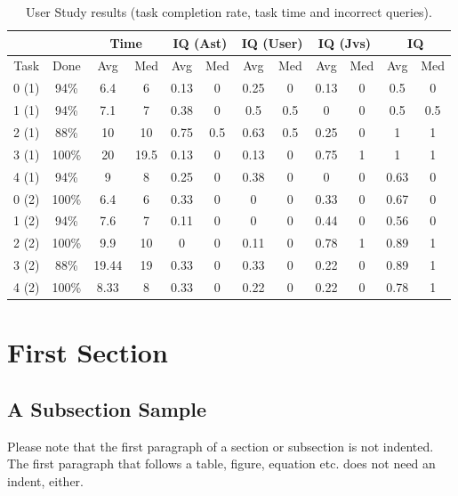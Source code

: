 \documentclass[runningheads]{llncs}
\begin{document}
\begin{table}
    \caption{User Study results (task completion rate, task time and incorrect queries).}
    \centering
    \begin{tabular}{ | c | c | c | c | c | c | c | c | c | c | c | c |}
    \hline
    \multicolumn{2}{|c|}{} & \multicolumn{2}{|c|}{Time} & \multicolumn{2}{|c|}{IQ (Ast)} & \multicolumn{2}{|c|}{IQ (User)} & \multicolumn{2}{|c|}{IQ (Jvs)} & \multicolumn{2}{|c|}{IQ} \\ \hline
    Task & Done & Avg & Med & Avg & Med & Avg & Med & Avg & Med & Avg & Med \\ \hline
    
    0 (1) & 94\% & 6.4 & 6 & 0.13 & 0 & 0.25 & 0 & 0.13 & 0 & 0.5 & 0 \\ \hline
    1 (1) & 94\% & 7.1 & 7 & 0.38 & 0 & 0.5 & 0.5 & 0 & 0 & 0.5 & 0.5 \\ \hline
    2 (1) & 88\% & 10 & 10 & 0.75 & 0.5 & 0.63 & 0.5 & 0.25 & 0 & 1 & 1 \\ \hline
    3 (1) & 100\% & 20 & 19.5 & 0.13 & 0 & 0.13 & 0 & 0.75 & 1 & 1 & 1 \\ \hline
    4 (1) & 94\% & 9 & 8 & 0.25 & 0 & 0.38 & 0 & 0 & 0 & 0.63 & 0 \\ \hline
    0 (2) & 100\% & 6.4 & 6 & 0.33 & 0 & 0 & 0 & 0.33 & 0 & 0.67 & 0 \\ \hline
    1 (2) & 94\% & 7.6 & 7 & 0.11 & 0 & 0 & 0 & 0.44 & 0 & 0.56 & 0 \\ \hline
    2 (2) & 100\% & 9.9 & 10 & 0 & 0 & 0.11 & 0 & 0.78 & 1 & 0.89 & 1 \\ \hline
    3 (2) & 88\% & 19.44 & 19 & 0.33 & 0 & 0.33 & 0 & 0.22 & 0 & 0.89 & 1 \\ \hline
    4 (2) & 100\% & 8.33 & 8 & 0.33 & 0 & 0.22 & 0 & 0.22 & 0 & 0.78 & 1 \\ \hline
    \end{tabular}

    \label{table:studyresults}
\end{table}

\section{First Section}
\subsection{A Subsection Sample}
Please note that the first paragraph of a section or subsection is
not indented. The first paragraph that follows a table, figure,
equation etc. does not need an indent, either.
\end{document}
